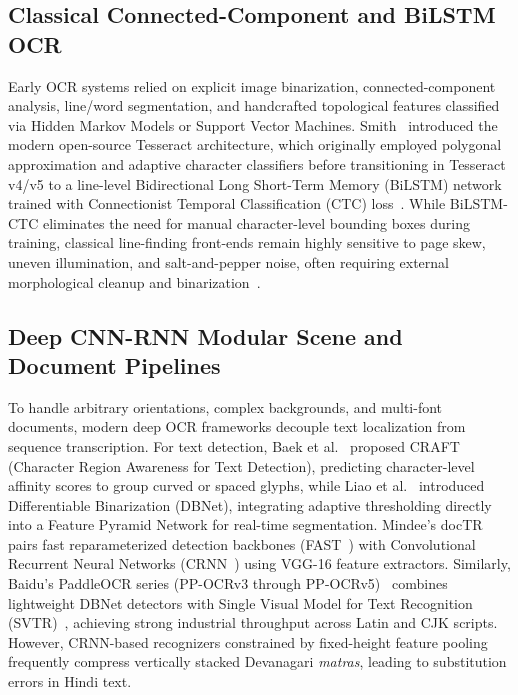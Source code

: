 \documentclass[11pt,a4paper]{article}
\begin{document}
\subsection{Classical Connected-Component and BiLSTM OCR}
Early OCR systems relied on explicit image binarization, connected-component analysis, line/word segmentation, and handcrafted topological features classified via Hidden Markov Models or Support Vector Machines. Smith~\cite{smith2007overview} introduced the modern open-source Tesseract architecture, which originally employed polygonal approximation and adaptive character classifiers before transitioning in Tesseract v4/v5 to a line-level Bidirectional Long Short-Term Memory (BiLSTM) network trained with Connectionist Temporal Classification (CTC) loss~\cite{graves2006connectionist,breuel2013high}. While BiLSTM-CTC eliminates the need for manual character-level bounding boxes during training, classical line-finding front-ends remain highly sensitive to page skew, uneven illumination, and salt-and-pepper noise, often requiring external morphological cleanup and binarization~\cite{otsu1979threshold,sauvola2000adaptive}.

\subsection{Deep CNN-RNN Modular Scene and Document Pipelines}
To handle arbitrary orientations, complex backgrounds, and multi-font documents, modern deep OCR frameworks decouple text localization from sequence transcription. For text detection, Baek et al.~\cite{baek2019character} proposed CRAFT (Character Region Awareness for Text Detection), predicting character-level affinity scores to group curved or spaced glyphs, while Liao et al.~\cite{liao2020real} introduced Differentiable Binarization (DBNet), integrating adaptive thresholding directly into a Feature Pyramid Network for real-time segmentation. Mindee's docTR~\cite{doctr2021} pairs fast reparameterized detection backbones (FAST~\cite{li2023fast}) with Convolutional Recurrent Neural Networks (CRNN~\cite{shi2016end}) using VGG-16 feature extractors. Similarly, Baidu's PaddleOCR series (PP-OCRv3 through PP-OCRv5)~\cite{du2020pp,li2022pp} combines lightweight DBNet detectors with Single Visual Model for Text Recognition (SVTR)~\cite{du2022svtr}, achieving strong industrial throughput across Latin and CJK scripts. However, CRNN-based recognizers constrained by fixed-height feature pooling frequently compress vertically stacked Devanagari \textit{matras}, leading to substitution errors in Hindi text.
\end{document}
